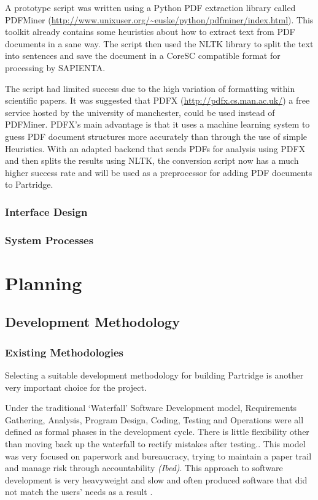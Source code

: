 \documentclass[12pt,a4paper]{article}
\begin{document}
A prototype script was written using a Python PDF extraction library called
PDFMiner (\url{http://www.unixuser.org/~euske/python/pdfminer/index.html}).
This toolkit already contains some heuristics about how to extract text from
PDF documents in a sane way\cite{pdfminer}. The script then used the NLTK
library to split the text into sentences and save the document in a CoreSC
compatible format for processing by SAPIENTA. 

The script had limited success due to the high variation of formatting within
scientific papers. It was suggested that PDFX (\url{http://pdfx.cs.man.ac.uk/})
a free service hosted by the university of manchester, could be used instead of
PDFMiner. PDFX's main advantage is that it uses a machine learning system to
guess PDF document structures more accurately than through the use of simple
Heuristics. With an adapted backend that sends PDFs for analysis using PDFX and
then splits the results using NLTK, the conversion script now has a much higher
success rate and will be used as a preprocessor for adding PDF  documents to
Partridge.

\subsubsection{Interface Design}

\subsubsection{System Processes}



\section{Planning}

\subsection{Development Methodology}

\subsubsection{Existing Methodologies}
Selecting a suitable development methodology for building Partridge is another
very important choice for the project.

Under the traditional `Waterfall' Software Development model, Requirements
Gathering, Analysis, Program Design, Coding, Testing and Operations were all
defined as formal phases in the development cycle. There is little flexibility
other than moving back up the waterfall to rectify mistakes after
testing.\cite{Royce:1987:MDL:41765.41801}. This model was very focused on
paperwork and bureaucracy, trying to maintain a paper trail and manage risk
through accountability \emph{(Ibed)}. This approach to software development is
very heavyweight and slow and often produced software that did not match the
users' needs as a result \cite{Boehm1988}.
\end{document}
